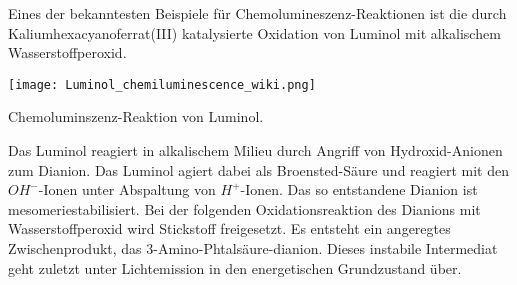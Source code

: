Eines der bekanntesten Beispiele für Chemolumineszenz-Reaktionen ist die durch Kaliumhexacyanoferrat(III) katalysierte Oxidation von Luminol mit alkalischem Wasserstoffperoxid. 

\begin{dsafigure}
 \centering
 \texttt{[image: Luminol\_chemiluminescence\_wiki.png]}
 \caption{Chemoluminszenz-Reaktion von Luminol. \cite{Luminol_wiki}}
 \label{dsafigure:Chemolumineszenz}
\end{dsafigure}

Das Luminol reagiert in alkalischem Milieu durch Angriff von Hydroxid-Anionen zum Dianion. Das Luminol agiert dabei als Broensted-Säure und reagiert mit den $ OH^{-} $-Ionen unter Abspaltung von $ H^{+} $-Ionen. Das so entstandene Dianion ist mesomeriestabilisiert. 
Bei der folgenden Oxidationsreaktion des Dianions mit Wasserstoffperoxid wird Stickstoff freigesetzt. Es entsteht ein angeregtes Zwischenprodukt, das 3-Amino-Phtalsäure-dianion. Dieses instabile Intermediat geht zuletzt unter Lichtemission in den energetischen Grundzustand über.  

